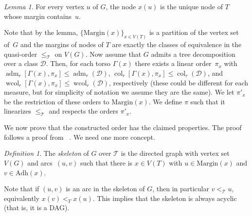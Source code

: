 \documentclass[1p,number,a4paper]{elsarticle}
\theoremstyle{remark}
\newcommand{\Dd}{\mathscr{D}}
\newcommand{\Tt}{\mathcal{T}}
\newcommand{\bag}{\mathrm{Bag}}
\newcommand{\adh}{\mathrm{Adh}}
\newcommand{\mrg}{\mathrm{Margin}}
\DeclareMathOperator{\col}{col}
\DeclareMathOperator{\wcol}{wcol}
\DeclareMathOperator{\adm}{adm}
\newtheorem{definition}[theorem]{Definition}
\newtheorem{lemma}[theorem]{Lemma}
\begin{document}
\begin{lemma}\label{lem:margins-prt}
  For every vertex $u$ of $G$, the node $x(u)$ is the unique node of $T$ whose margin contains~$u$.
  \end{lemma}
  
  Note that by the lemma, $\{\mrg(x)\}_{x\in V(T)}$ is a partition of the vertex set of~$G$ and the margins of nodes of $T$ are exactly the classes of equivalence in the quasi-order $\leq_{\Tt}$ on $V(G)$. Now assume that $G$ admits a tree decomposition over a class $\Dd$. 
  Then, for each torso $\Gamma(x)$ there exists a linear order~$\pi_x$ with $\adm_r[\Gamma(x),\pi_x]\leq \adm_r(\Dd)$, $\col_r[\Gamma(x),\pi_x]\leq \col_r(\Dd)$, and $\wcol_r[\Gamma(x),\pi_x]\leq \wcol_r(\Dd)$, respectively (these could be different for each measure, but for simplicity of notation we assume they are the same). 
  We let $\pi'_x$ be the restriction of these orders to $\mrg(x)$. 
  We define $\pi$ such that it linearizes $\leq_\mathcal{T}$ and respects the orders $\pi'_x$. 

We now prove that the constructed order has the claimed properties. The proof follows a proof from ~\cite{pilipczuk2019polynomial}.
We need one more concept. 
 
\begin{definition}
  The \emph{skeleton} of $G$ over $\Tt$ is the directed graph
  with vertex set $V(G)$ and arcs~$(u,v)$ such that there is $x\in V(T)$ with $u\in \mrg(x)$ and $v\in \adh(x)$. 
\end{definition}

Note that if $(u,v)$ is an arc in the skeleton of $G$, then in particular $v<_{\Tt} u$, equivalently $x(v)<_T x(u)$. This implies that the skeleton is always acyclic (that is, it is a DAG).


\end{document}
